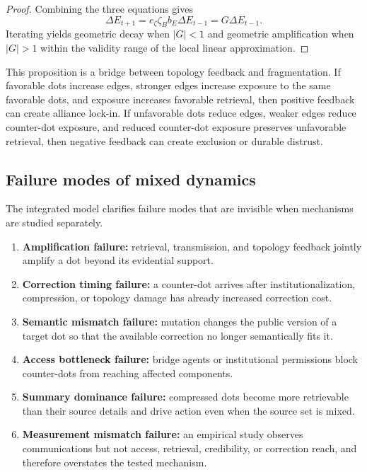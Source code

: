 \documentclass[11pt]{article}
\theoremstyle{remark}
\begin{document}
\begin{proof}
Combining the three equations gives
\[
\Delta E_{t+1}=e_\zeta\zeta_Bb_E\Delta E_{t-1}=G\Delta E_{t-1}.
\]
Iterating yields geometric decay when \(|G|<1\) and geometric amplification when \(|G|>1\) within the validity range of the local linear approximation.
\end{proof}

This proposition is a bridge between topology feedback and fragmentation. If favorable dots increase edges, stronger edges increase exposure to the same favorable dots, and exposure increases favorable retrieval, then positive feedback can create alliance lock-in. If unfavorable dots reduce edges, weaker edges reduce counter-dot exposure, and reduced counter-dot exposure preserves unfavorable retrieval, then negative feedback can create exclusion or durable distrust.

\subsection{Failure modes of mixed dynamics}\label{mixed-dynamics-failure-modes}

The integrated model clarifies failure modes that are invisible when mechanisms are studied separately.

\begin{enumerate}[leftmargin=*]
\item \textbf{Amplification failure:} retrieval, transmission, and topology feedback jointly amplify a dot beyond its evidential support.
\item \textbf{Correction timing failure:} a counter-dot arrives after institutionalization, compression, or topology damage has already increased correction cost.
\item \textbf{Semantic mismatch failure:} mutation changes the public version of a target dot so that the available correction no longer semantically fits it.
\item \textbf{Access bottleneck failure:} bridge agents or institutional permissions block counter-dots from reaching affected components.
\item \textbf{Summary dominance failure:} compressed dots become more retrievable than their source details and drive action even when the source set is mixed.
\item \textbf{Measurement mismatch failure:} an empirical study observes communications but not access, retrieval, credibility, or correction reach, and therefore overstates the tested mechanism.
\end{enumerate}
\end{document}
